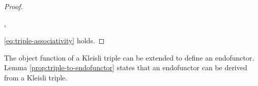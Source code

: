\begin{lemma}
\begin{proof}
\begin{steps}
      ,
    \end{steps}
    \eqref{eq:triple-associativity} holds.
  \end{proof}
\end{lemma}

The object function of a Kleisli triple can be extended to define an
endofunctor. Lemma \ref{prop:triple-to-endofunctor} states that
an endofunctor can be derived from a Kleisli triple.

